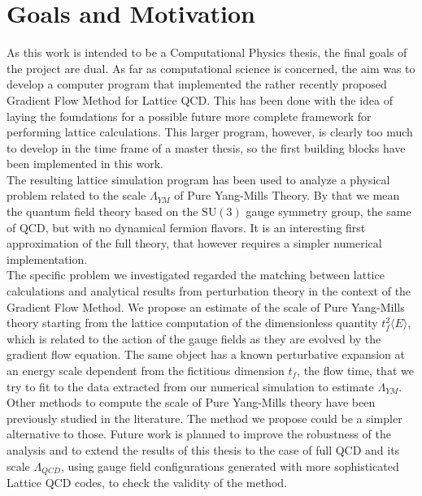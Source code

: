 \section{Goals and Motivation}
As this work is intended to be a Computational Physics thesis, the final goals of the project are dual. As far as computational science is concerned, the aim was to develop a computer program that implemented the rather recently proposed Gradient Flow Method \cite{luscher_properties_2010} for Lattice QCD. This has been done with the idea of laying the foundations for a possible future more complete framework for performing lattice calculations. This larger program, however, is clearly too much to develop in the time frame of a master thesis, so the first building blocks have been implemented in this work.\\
The resulting lattice simulation program has been used to analyze a physical problem related to the scale $\Lambda_{YM}$ of Pure Yang-Mills Theory. By that we mean the quantum field theory based on the $\mathrm{SU}(3)$ gauge symmetry group, the same of QCD, but with no dynamical fermion flavors. It is an interesting first approximation of the full theory, that however requires a simpler numerical implementation. \\
The specific problem we investigated regarded the matching between lattice calculations and analytical results from perturbation theory in the context of the Gradient Flow Method. We propose an estimate of the scale of Pure Yang-Mills theory starting from the lattice computation of the dimensionless quantity $t_f^2\langle E\rangle$, which is related to the action of the gauge fields as they are evolved by the gradient flow equation. The same object has a known perturbative expansion at an energy scale dependent from the fictitious dimension $t_f$, the flow time, that we try to fit to the data extracted from our numerical simulation to estimate $\Lambda_{YM}$. \\
Other methods to compute the scale of Pure Yang-Mills theory have been previously studied in the literature\cite{capitani_non-perturbative_1999,brida_determination_2016}. The method we propose could be a simpler alternative to those. Future work is planned to improve the robustness of the analysis and to extend the results of this thesis to the case of full QCD and its scale $\Lambda_{QCD}$, using gauge field configurations generated with more sophisticated Lattice QCD codes, to check the validity of the method.

